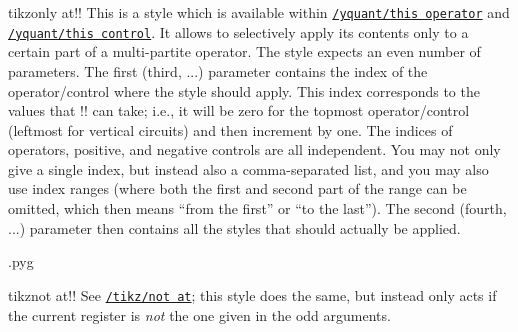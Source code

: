 \documentclass{scrartcl}
\makeatletter
\let\unpatched@minted@inline@iii=\minted@inline@iii%
\def\patched@minted@inline@iii#1{%
      \unpatched@minted@inline@iii{#1}%
      \par%
      \endgroup\vskip-\parskip%
      \noindent\ignorespaces%
   }
\def\patch@mintinline{%
      \let\minted@inline@iii=\patched@minted@inline@iii%
   }
\let\unpatched@RobustMintInlineProcess@ii=\RobustMintInlineProcess@ii
\def\patched@RobustMintInlineProcess@ii#1{%
      \unpatched@RobustMintInlineProcess@ii{#1}%
      \par%
      \endgroup\vskip-\parskip%
      \noindent\ignorespaces%
   }
\def\patch@mintinline{%
      \let\RobustMintInlineProcess@ii=\patched@RobustMintInlineProcess@ii%
   }
\newenvironment{option*}[3][]{\vskip5mm%
   \noindent\begin{minipage}[t]{\linewidth}%
      \begingroup%
         \patch@mintinline%
         \raggedleft%
         \hspace*{-1cm}%
         \phantomsection\label{{style:/#2/#3}}%
         \texttt{\ifstrempty{#1}\relax{\compat{#1}}\textcolor{gray}{/#2/}\textcolor{mintgreen}{#3}}\hfill default: %
         \tex}{%
   \end{minipage}}
\newenvironment{codeexample}{%
   \VerbatimEnvironment%
   \let\FVB@VerbatimOut\minted@FVB@VerbatimOut
   \let\FVE@VerbatimOut\minted@FVE@VerbatimOut
   \minted@configlang{tex}%
   \minted@fvset
   \begin{VerbatimOut}[codes={\catcode`\^^I=12},firstline,lastline]{\minted@jobname.pyg}%
}{
   \end{VerbatimOut}%
   \minted@langlinenoson%
   \savebox\codeexamplebox{ \minted@jobname.pyg}%
   \ifdim\wd\codeexamplebox>\dimexpr.5\linewidth-3mm\relax%
      \wd\codeexamplebox=.5\linewidth%
   \else%
      \wd\codeexamplebox=\dimexpr\wd\codeexamplebox+3mm\relax%
   \fi%
   \noindent\begin{minipage}{\wd\codeexamplebox}%
      \centering%
      \usebox\codeexamplebox%
   \end{minipage}%
   \begin{minipage}{\dimexpr\linewidth-\wd\codeexamplebox\relax}%
      \expandafter\minted@pygmentize\expandafter{\minted@lang}%
   \end{minipage}%
   \minted@langlinenosoff%
   \par%
}
\def\style#1{\hyperref[style:#1]{\texttt{#1}}}
\makeatother
\begin{document}
         \begin{option*}[New in 0.7.3]{tikz}{only at}!!
            This is a style which is available within \style{/yquant/this operator} and \style{/yquant/this control}.
            It allows to selectively apply its contents only to a certain part of a multi\hyp partite operator.
            The style expects an even number of parameters.
            The first (third, ...) parameter contains the index of the operator/control where the style should apply.
            This index corresponds to the values that \tex!\idx! can take; i.e., it will be zero for the topmost operator/control (leftmost for vertical circuits) and then increment by one.
            The indices of operators, positive, and negative controls are all independent.
            You may not only give a single index, but instead also a comma\hyp separated list, and you may also use index ranges (where both the first and second part of the range can be omitted, which then means ``from the first'' or ``to the last'').
            The second (fourth, ...) parameter then contains all the styles that should actually be applied.

            \begin{codeexample}
            \end{codeexample}
         \end{option*}

         \begin{option*}[New in 0.7.3]{tikz}{not at}!!
            See \style{/tikz/not at}; this style does the same, but instead only acts if the current register is \emph{not} the one given in the odd arguments.
         \end{option*}
\end{document}
